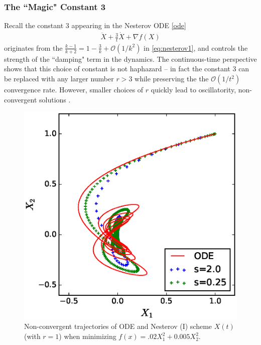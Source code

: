 \subsubsection{The ``Magic" Constant 3}
Recall the constant $3$ appearing in the Nesterov ODE \eqref{ode}
\begin{align}
    \ddot{X} + \frac{3}{t} \dot{X} + \nabla f(X) 
\end{align}
originates from the $\frac{k-1}{k+2} = 1 - \frac{3}{k} + \mathcal{O}(1/k^2)$ in \eqref{eq:nesterov1}, and controls the strength of the ``damping" term in the dynamics. The continuous-time perspective shows that this choice of constant is not haphazard -- in fact the constant $3$ can be replaced with any larger number $r>3$ while preserving the the $\mathcal{O}(1/t^2)$ convergence rate. However, smaller choices of $r$ quickly lead to oscillatority, non-convergent solutions \citep{su2014differential}.
\begin{figure}[H]
\begin{center}
\includegraphics[width=0.5\linewidth]{Experiments/quadratic_traj_compare_annealed_r1.eps}
\caption{Non-convergent trajectories of ODE and Nesterov (I) scheme $X(t)$ (with $r=1$) when minimizing $f(x) = .02 X_1^2 + 0.005 X_2^2$.}
\end{center}
\end{figure}

